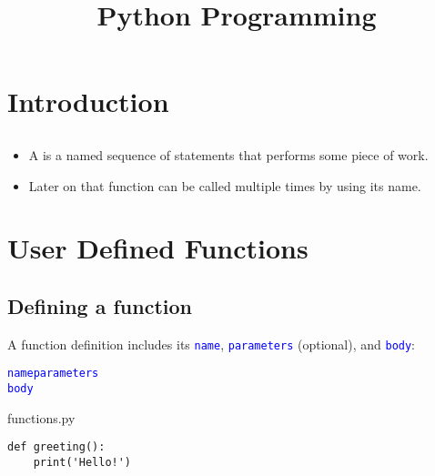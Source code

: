 \documentclass[aspectratio=1610,slidestop]{beamer}
\author{}
\title{Python Programming}
\newcommand{\decl}[1]{\textcolor{blue}{\lstinline{#1}}}
\begin{document}

\makeTitleSlide{}


\section{Introduction}

\makeTableOfContents

\subsection{ }
\begin{pframe}
 \begin{itemize}
  \item A  is a named sequence of statements that performs some
        piece of work.
  \item Later on that function can be called multiple times by using its name.
 \end{itemize}
\end{pframe}


\section{User Defined Functions}

\subsection{Defining a function}
\begin{pframe}
 A function definition includes its \decl{name}, \decl{parameters} (optional), and \decl{body}:
 \begin{pythondeclaration}
  \textvisiblespace\decl{name}\emp{(}\decl{parameters}\emp{):}\\
  \textvisiblespace\textvisiblespace\textvisiblespace\textvisiblespace\decl{body}
 \end{pythondeclaration}
 \pause
 \begin{pythonfile}{functions.py}
  \begin{verbatim}
def greeting():
    print('Hello!')
  \end{verbatim}
 \end{pythonfile}
\end{pframe}
\end{document}
